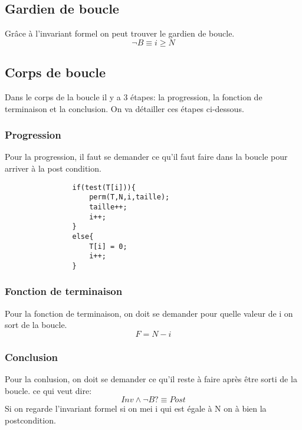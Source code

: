 \documentclass[a4paper, 11pt, oneside]{article}
\begin{document}
    \subsection{Gardien de boucle}
        Grâce à l'invariant formel on peut trouver le gardien de boucle.
        \[
            \neg B \equiv i \geq N
        \]
    \subsection{Corps de boucle}
        Dans le corps de la boucle il y a 3 étapes: la progression, la fonction de terminaison et la conclusion. On va
        détailler ces étapes ci-dessous.

        \subsubsection{Progression}
            Pour la progression, il faut se demander ce qu'il faut faire dans la boucle pour arriver à la post condition.
            \begin{lstlisting}
                if(test(T[i])){
                    perm(T,N,i,taille);
                    taille++;
                    i++;
                }
                else{
                    T[i] = 0;
                    i++;
                }

            \end{lstlisting}
        
        \subsubsection{Fonction de terminaison}
            Pour la fonction de terminaison, on doit se demander pour quelle valeur de i on sort de la boucle.
            \[
                F = N-i
            \]
        
        \subsubsection{Conclusion}
            Pour la conlusion, on doit se demander ce qu'il reste à faire après être sorti de la boucle. ce qui veut dire:
            \[
                Inv \wedge \neg B ?\equiv Post
            \]
            Si on regarde l'invariant formel si on mei i qui est égale à N on à bien la postcondition.
\end{document}
